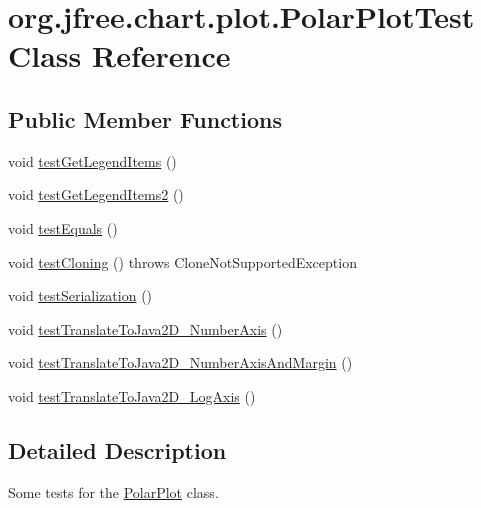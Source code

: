 \hypertarget{classorg_1_1jfree_1_1chart_1_1plot_1_1_polar_plot_test}{}\section{org.\+jfree.\+chart.\+plot.\+Polar\+Plot\+Test Class Reference}
\label{classorg_1_1jfree_1_1chart_1_1plot_1_1_polar_plot_test}
\subsection*{Public Member Functions}
\begin{DoxyCompactItemize}
\item 
void \mbox{\hyperlink{classorg_1_1jfree_1_1chart_1_1plot_1_1_polar_plot_test_ab989c6a4144bc883170ff7ac9d8b3c34}{test\+Get\+Legend\+Items}} ()
\item 
void \mbox{\hyperlink{classorg_1_1jfree_1_1chart_1_1plot_1_1_polar_plot_test_a01e1974b934636f9601f55c4dc6c6f27}{test\+Get\+Legend\+Items2}} ()
\item 
void \mbox{\hyperlink{classorg_1_1jfree_1_1chart_1_1plot_1_1_polar_plot_test_a50bd21b328db1917d66d17884075bce1}{test\+Equals}} ()
\item 
void \mbox{\hyperlink{classorg_1_1jfree_1_1chart_1_1plot_1_1_polar_plot_test_a3a97cba4c286322b2f87a6f6bcbbcec6}{test\+Cloning}} ()  throws Clone\+Not\+Supported\+Exception 
\item 
void \mbox{\hyperlink{classorg_1_1jfree_1_1chart_1_1plot_1_1_polar_plot_test_a3f93703be6519d300cdd302dc53b2222}{test\+Serialization}} ()
\item 
void \mbox{\hyperlink{classorg_1_1jfree_1_1chart_1_1plot_1_1_polar_plot_test_add037144b640476934ac40c56cea0970}{test\+Translate\+To\+Java2\+D\+\_\+\+Number\+Axis}} ()
\item 
void \mbox{\hyperlink{classorg_1_1jfree_1_1chart_1_1plot_1_1_polar_plot_test_a09ffc5cee9d795374b1addef492e7635}{test\+Translate\+To\+Java2\+D\+\_\+\+Number\+Axis\+And\+Margin}} ()
\item 
void \mbox{\hyperlink{classorg_1_1jfree_1_1chart_1_1plot_1_1_polar_plot_test_acf23cb45331d0abf6ced4afc3d2dad80}{test\+Translate\+To\+Java2\+D\+\_\+\+Log\+Axis}} ()
\end{DoxyCompactItemize}


\subsection{Detailed Description}
Some tests for the \mbox{\hyperlink{classorg_1_1jfree_1_1chart_1_1plot_1_1_polar_plot}{Polar\+Plot}} class. 

